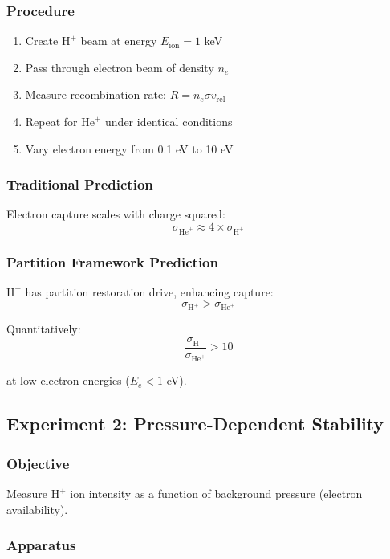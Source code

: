 \documentclass[12pt,a4paper]{article}
\begin{document}
\subsubsection{Procedure}

\begin{enumerate}
\item Create $\text{H}^+$ beam at energy $E_{\text{ion}} = 1$ keV
\item Pass through electron beam of density $n_e$
\item Measure recombination rate: $R = n_e \sigma v_{\text{rel}}$
\item Repeat for $\text{He}^+$ under identical conditions
\item Vary electron energy from 0.1 eV to 10 eV
\end{enumerate}

\subsubsection{Traditional Prediction}

Electron capture scales with charge squared:
$$
\sigma_{\text{He}^+} \approx 4 \times \sigma_{\text{H}^+}
$$

\subsubsection{Partition Framework Prediction}

$\text{H}^+$ has partition restoration drive, enhancing capture:
$$
\sigma_{\text{H}^+} > \sigma_{\text{He}^+}
$$

Quantitatively:
$$
\frac{\sigma_{\text{H}^+}}{\sigma_{\text{He}^+}} > 10
$$

at low electron energies ($E_e < 1$ eV).

\subsection{Experiment 2: Pressure-Dependent Stability}

\subsubsection{Objective}

Measure $\text{H}^+$ ion intensity as a function of background pressure (electron availability).

\subsubsection{Apparatus}
\end{document}

